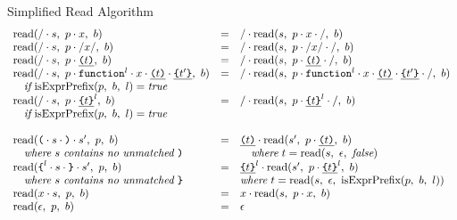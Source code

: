 \documentclass[preprint,10pt]{sigplanconf}
\begin{document}
\begin{displayfigure*}{\label{fig:simpleread}Simplified Read Algorithm}
\[\begin{array}{lcll}
    \textrm{read}(/\cdot s,~p\cdot x,~b)
    &=&
    / \cdot 
      \textrm{read}(s,~
        p\cdot x\cdot /
      ,~b)
   
    \\
    \textrm{read}(/\cdot s,~p \cdot /x/,~b)
    &=&
    / \cdot 
      \textrm{read}(s,~
        p \cdot /x/ \cdot /
      ,~b)
   
    \\
    \textrm{read}(/\cdot s,~p \cdot \underline{ \texttt{(} t \texttt{)}},~b)
    &=&
    / \cdot 
      \textrm{read}(s,~
        p \cdot \underline{ \texttt{(} t \texttt{)}} \cdot /
      ,~b)
   
    \\
    \textrm{read}(/\cdot s,~
      p  \cdot \texttt{function}^l \cdot x
      \cdot \underline{ \texttt{(} t \texttt{)}} \cdot \underline{ \texttt{\{} t' \texttt{\}} }
    ,~b)
    &=&
    / \cdot 
      \textrm{read}(s,~
        p  \cdot \texttt{function}^l \cdot x \cdot \underline{ \texttt{(} t \texttt{)}}
        \cdot \underline{ \texttt{\{} t' \texttt{\}} } \cdot /
      ,~b)
   
    \\
    \quad \textit{if}~\textrm{isExprPrefix}(p,~b,~l)= \textit{true}
    \\
    \textrm{read}(/\cdot s,~
      p \cdot \underline{ \texttt{\{} t \texttt{\}} }^{l}
    ,~b)
    &=&
    / \cdot 
      \textrm{read}(s,~
        p \cdot \underline{ \texttt{\{} t \texttt{\}} }^{l} \cdot /
      ,~b)
   
    \\
    \quad \textit{if}~\textrm{isExprPrefix}(p,~b,~l)= \textit{true}

    \\ \\
    

    \textrm{read}(\texttt{(} \cdot s \cdot \texttt{)} \cdot s',~p,~b)
    &=&
    \underline{ \texttt{(} t \texttt{)}} \cdot 
      \textrm{read}(s',~p \cdot \underline{ \texttt{(} t \texttt{)}},~b)
    
    \\
    \quad \textit{where}~s~\textit{contains no unmatched}~\texttt{)} 
    &&\quad \textit{where}~t = \textrm{read}(s,~\epsilon,~\textit{false}) 
    \\
    \textrm{read}(
      \texttt{\{}^l \cdot s \cdot \texttt{\}} \cdot s'
    ,~p,~b)
    &=&
    \underline{ \texttt{\{} t \texttt{\}} }^l \cdot 
      \textrm{read}(s',~
        p \cdot \underline{ \texttt{\{} t \texttt{\}} }^l
      ,~b)
    
    \\
    \quad \textit{where}~s~\textit{contains no unmatched}~\texttt{\}} 
    && \textit{where}~t = \textrm{read}(s,~\epsilon,~\textrm{isExprPrefix}(p,~b,~l))
    \\
    \textrm{read}(x \cdot s,~p,~b)
    &=&
    x \cdot 
      \textrm{read}(s,~p \cdot x,~b)
   
    \\
    \textrm{read}(\epsilon,~p,~b)
    &=&
    \epsilon \\
  \end{array}
\]
\end{displayfigure*}
\end{document}
